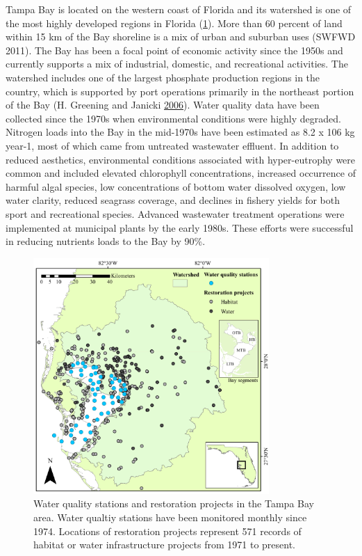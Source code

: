 \documentclass[]{article}
\begin{document}
Tampa Bay is located on the western coast of Florida and its watershed
is one of the most highly developed regions in Florida (\cref{fig:map}).
More than 60 percent of land within 15 km of the Bay shoreline is a mix
of urban and suburban uses (SWFWD 2011). The Bay has been a focal point
of economic activity since the 1950s and currently supports a mix of
industrial, domestic, and recreational activities. The watershed
includes one of the largest phosphate production regions in the country,
which is supported by port operations primarily in the northeast portion
of the Bay (H. Greening and Janicki
\protect\hyperlink{ref-Greening06}{2006}). Water quality data have been
collected since the 1970s when environmental conditions were highly
degraded. Nitrogen loads into the Bay in the mid-1970s have been
estimated as 8.2 x 106 kg year-1, most of which came from untreated
wastewater effluent. In addition to reduced aesthetics, environmental
conditions associated with hyper-eutrophy were common and included
elevated chlorophyll concentrations, increased occurrence of harmful
algal species, low concentrations of bottom water dissolved oxygen, low
water clarity, reduced seagrass coverage, and declines in fishery yields
for both sport and recreational species. Advanced wastewater treatment
operations were implemented at municipal plants by the early 1980s.
These efforts were successful in reducing nutrients loads to the Bay by
90\%.

\begin{figure}
\centerline{\includegraphics[width = 0.8\textwidth]{figs/tbrest_map.pdf}}
\caption{Water quality stations and restoration projects in the Tampa Bay area.  Water qualtiy stations have been monitored monthly since 1974.  Locations of restoration projects represent 571 records of habitat or water infrastructure projects from 1971 to present.}
\label{fig:map}
\end{figure}
\end{document}
